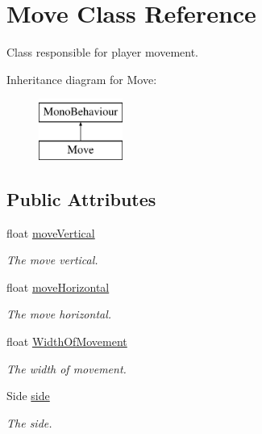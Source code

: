 \hypertarget{class_move}{}\section{Move Class Reference}
\label{class_move}


Class responsible for player movement.  


Inheritance diagram for Move\+:\begin{figure}[H]
\begin{center}
\leavevmode
\includegraphics[height=2.000000cm]{class_move}
\end{center}
\end{figure}
\subsection*{Public Attributes}
\begin{DoxyCompactItemize}
\item 
float \mbox{\hyperlink{class_move_a248dd0919f2777f32c019ca10c342629}{move\+Vertical}}
\begin{DoxyCompactList}\small\item\em The move vertical. \end{DoxyCompactList}\item 
float \mbox{\hyperlink{class_move_a2777ede3b7fbfd425deb04fe8fd69791}{move\+Horizontal}}
\begin{DoxyCompactList}\small\item\em The move horizontal. \end{DoxyCompactList}\item 
float \mbox{\hyperlink{class_move_a564c70756027d119d684db3edfede659}{Width\+Of\+Movement}}
\begin{DoxyCompactList}\small\item\em The width of movement. \end{DoxyCompactList}\item 
Side \mbox{\hyperlink{class_move_a0cf32cb803f7b4783a49ea55c9746dba}{side}}
\begin{DoxyCompactList}\small\item\em The side. \end{DoxyCompactList}\end{DoxyCompactItemize}


